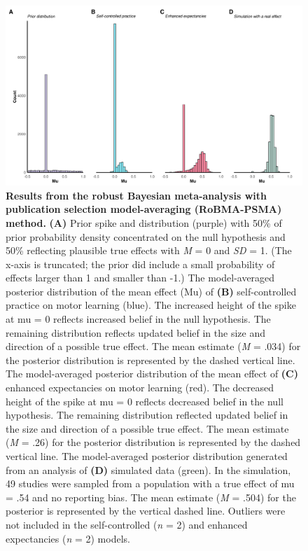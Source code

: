 \documentclass[
  doc, donotrepeattitle,floatsintext]{apa7}
\begin{document}
\begin{figure}

{\centering \includegraphics{../../figs/fig2} 

}

\caption{\normalfont \small \textbf{Results from the robust Bayesian meta-analysis with publication selection model-averaging (RoBMA-PSMA) method.} \textbf{(A)} Prior spike and distribution (purple) with 50\% of prior probability density concentrated on the null hypothesis and 50\% reflecting plausible true effects with \emph{M} = 0 and \emph{SD} = 1. (The x-axis is truncated; the prior did include a small probability of effects larger than 1 and smaller than -1.) The model-averaged posterior distribution of the mean effect (Mu) of \textbf{(B)} self-controlled practice on motor learning (blue). The increased height of the spike at mu = 0 reflects increased belief in the null hypothesis. The remaining distribution reflects updated belief in the size and direction of a possible true effect. The mean estimate (\emph{M} = .034) for the posterior distribution is represented by the dashed vertical line. The model-averaged posterior distribution of the mean effect of \textbf{(C)} enhanced expectancies on motor learning (red). The decreased height of the spike at mu = 0 reflects decreased belief in the null hypothesis. The remaining distribution reflected updated belief in the size and direction of a possible true effect. The mean estimate (\emph{M} = .26) for the posterior distribution is represented by the dashed vertical line. The model-averaged posterior distribution generated from an analysis of \textbf{(D)} simulated data (green). In the simulation, 49 studies were sampled from a population with a true effect of mu = .54 and no reporting bias. The mean estimate (\emph{M} = .504) for the posterior is represented by the vertical dashed line. Outliers were not included in the self-controlled (\emph{n} = 2) and enhanced expectancies (\emph{n} = 2) models.}\label{fig:fig2}
\end{figure}
\end{document}
